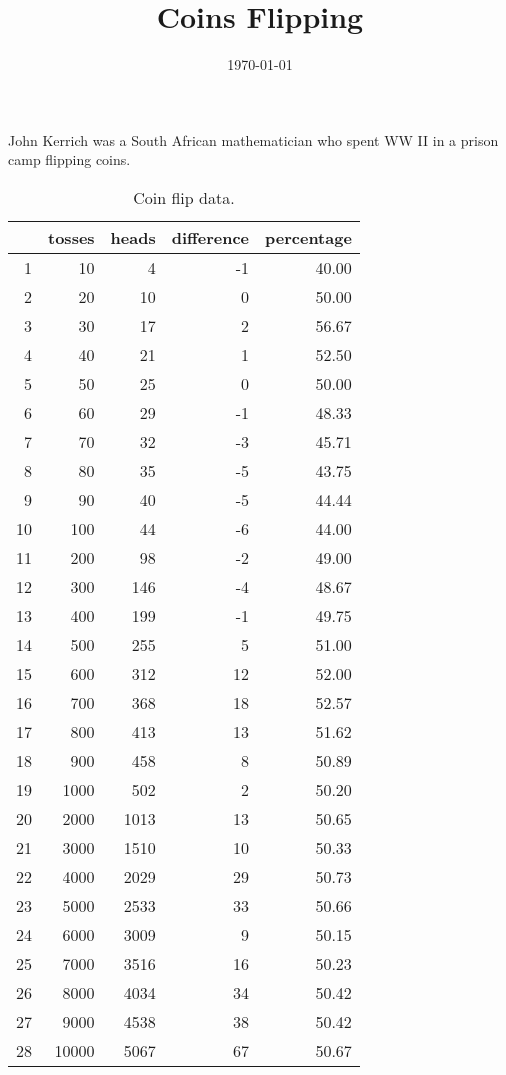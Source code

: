 \documentclass[letterpaper]{article}
\title{Coins Flipping}
\date{\today}
\author{}
\begin{document}
  \maketitle

  John Kerrich was a South African mathematician who spent WW II in a prison camp
  flipping coins.

  \begin{table}[H]
  \centering
    \begin{tabular}{rrrrr}
      \toprule
          & tosses & heads & difference & percentage \\
      \midrule
      1   & 10     & 4     & -1         & 40.00 \\
      2   & 20     & 10    & 0          & 50.00 \\
      3   & 30     & 17    & 2          & 56.67 \\
      4   & 40     & 21    & 1          & 52.50 \\
      5   & 50     & 25    & 0          & 50.00 \\
      6   & 60     & 29    & -1         & 48.33 \\
      7   & 70     & 32    & -3         & 45.71 \\
      8   & 80     & 35    & -5         & 43.75 \\
      9   & 90     & 40    & -5         & 44.44 \\
      10  & 100    & 44    & -6         & 44.00 \\
      11  & 200    & 98    & -2         & 49.00 \\
      12  & 300    & 146   & -4         & 48.67 \\
      13  & 400    & 199   & -1         & 49.75 \\
      14  & 500    & 255   & 5          & 51.00 \\
      15  & 600    & 312   & 12         & 52.00 \\
      16  & 700    & 368   & 18         & 52.57 \\
      17  & 800    & 413   & 13         & 51.62 \\
      18  & 900    & 458   & 8          & 50.89 \\
      19  & 1000   & 502   & 2          & 50.20 \\
      20  & 2000   & 1013  & 13         & 50.65 \\
      21  & 3000   & 1510  & 10         & 50.33 \\
      22  & 4000   & 2029  & 29         & 50.73 \\
      23  & 5000   & 2533  & 33         & 50.66 \\
      24  & 6000   & 3009  & 9          & 50.15 \\
      25  & 7000   & 3516  & 16         & 50.23 \\
      26  & 8000   & 4034  & 34         & 50.42 \\
      27  & 9000   & 4538  & 38         & 50.42 \\
      28  & 10000  & 5067  & 67         & 50.67 \\
      \bottomrule
    \end{tabular}\caption{Coin flip data.}
  \end{table}
\end{document}
